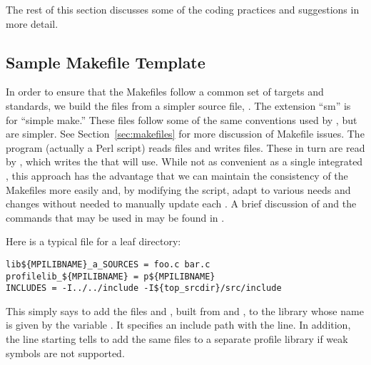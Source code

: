 \documentclass{article}
\begin{document}
The rest of this section discusses some of the coding practices and
suggestions in more detail.

\subsection{Sample Makefile Template}
\label{sec:makefile-template}

In order to ensure that the Makefiles follow a common set of targets and
standards, we build the  files from a simpler source file,
.  The extension ``sm'' is for ``simple make.''  These files
follow some of the same conventions used by , but are simpler.
See Section~\ref{sec:makefiles} for more discussion of Makefile issues.
The program (actually a Perl script)  reads
 files and writes  files.  These in turn
are read by , which writes the  that
 will use.  While not as convenient as a single integrated
, this approach has the advantage that we can maintain the
consistency of the Makefiles more easily and, by modifying the
 script, adapt to various needs and changes without needed to
manually update each .  A brief discussion of
 and the commands that may be used in
 may be found in . 

Here is a typical  file for a leaf directory:
\begin{verbatim}
lib${MPILIBNAME}_a_SOURCES = foo.c bar.c
profilelib_${MPILIBNAME} = p${MPILIBNAME}
INCLUDES = -I../../include -I${top_srcdir}/src/include
\end{verbatim}
This simply says to add the files  and , built
from  and , to the library whose name is given
by the  variable .  It specifies an
include path with the  line.  In addition, the line
starting  tells  to add the same
files to a separate profile library if weak symbols are not supported.
\end{document}
